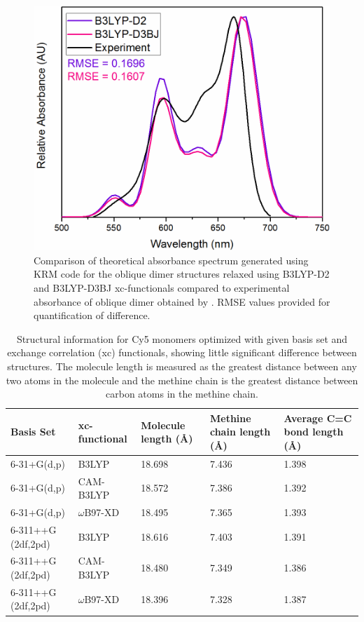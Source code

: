 \begin{figure}[h!]
  \centering
  \includegraphics[width=0.8\linewidth]{figures/pub1/ob-dimer-B3LYP-D3andD2.pdf}
  \caption{Comparison of theoretical absorbance spectrum generated using KRM code for the oblique dimer structures relaxed using B3LYP-D2 and B3LYP-D3BJ xc-functionals compared to experimental absorbance of oblique dimer obtained by \citet{Cannon2017}. RMSE values provided for quantification of difference.}\label{spectra-d2d3}
\end{figure}

\begin{table}[h]
\centering
\caption{Structural information for Cy5 monomers optimized with given basis set and exchange correlation (xc) functionals, showing little significant difference between structures. The molecule length is measured as the greatest distance between any two atoms in the molecule and the methine chain is the greatest distance between carbon atoms in the methine chain. } \label{tab:structure}
\begin{tabular}{|p{25mm}|p{25mm}|p{22mm}|p{28mm}|p{30mm}|}
\hline
Basis Set & xc-functional & Molecule \newline length (\AA) & Methine chain \newline length (\AA) & Average C=C \newline bond length (\AA) \\ \hline
6-31+G(d,p) & B3LYP & 18.698 & 7.436 & 1.398 \\ \hline
6-31+G(d,p) & CAM-B3LYP & 18.572 & 7.386 & 1.392 \\ \hline
6-31+G(d,p) & $\omega$B97-XD & 18.495 & 7.365 & 1.393 \\ \hline
6-311++G \newline (2df,2pd) & B3LYP & 18.616 & 7.403 & 1.391 \\ \hline
6-311++G \newline (2df,2pd) & CAM-B3LYP & 18.480 & 7.349 & 1.386 \\ \hline
6-311++G \newline (2df,2pd) & $\omega$B97-XD & 18.396 & 7.328 & 1.387 \\ \hline
\end{tabular}
\end{table}

